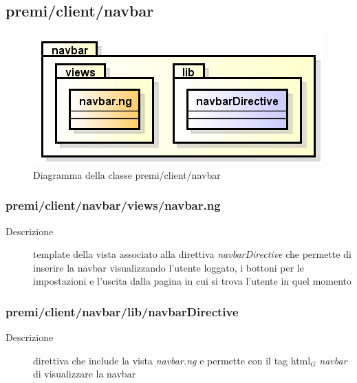 \subsection{premi/client/navbar}
\begin{figure}[H]
\begin{center}
\includegraphics[scale=0.70]{img/diapkg/navbar.png}
\caption{Diagramma della classe premi/client/navbar}
\end{center}
\end{figure}

\subsubsection{premi/client/navbar/views/navbar.ng}

\begin{description}
\item[Descrizione] \hfill
	template della vista associato alla direttiva \textit{navbarDirective} che permette di inserire la navbar visualizzando l'utente loggato, i bottoni per le impostazioni e l'uscita dalla pagina in cui si trova l'utente in quel momento 
\end{description}

\subsubsection{premi/client/navbar/lib/navbarDirective}

\begin{description}
\item[Descrizione] \hfill
	direttiva che include la vista \textit{navbar.ng} e permette con il tag html$_G$ \textit{navbar} di visualizzare la navbar
\end{description}